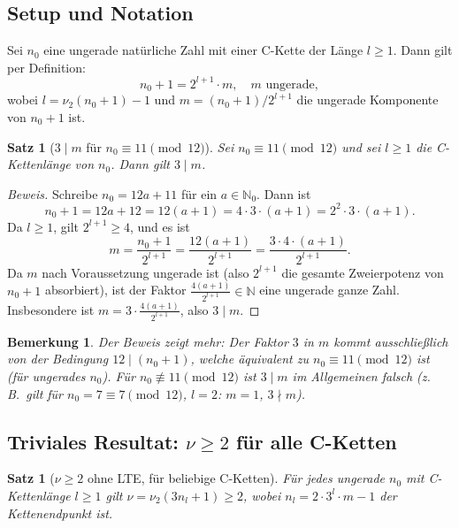\documentclass[12pt,a4paper]{article}
\newtheorem{bemerkung}[definition]{Bemerkung}
\newtheorem{satz}[definition]{Satz}
\newenvironment{beweis}{\begin{proof}[Beweis]}{\end{proof}}
\newcommand{\vii}{\nu_2}
\newcommand{\N}{\mathbb{N}}
\begin{document}
\subsection{Setup und Notation}

Sei $n_0$ eine ungerade natürliche Zahl mit einer C-Kette der Länge $l \geq 1$.
Dann gilt per Definition:
\[
  n_0 + 1 = 2^{l+1} \cdot m, \quad m \text{ ungerade},
\]
wobei $l = \vii(n_0 + 1) - 1$ und $m = (n_0 + 1)/2^{l+1}$ die ungerade
Komponente von $n_0 + 1$ ist.

\begin{satz}[$3 \mid m$ für $n_0 \equiv 11 \pmod{12}$]
\label{satz:drei_teilt_m}
Sei $n_0 \equiv 11 \pmod{12}$ und sei $l \geq 1$ die C-Kettenlänge von $n_0$.
Dann gilt $3 \mid m$.
\end{satz}

\begin{beweis}
Schreibe $n_0 = 12a + 11$ für ein $a \in \N_0$.
Dann ist
\[
  n_0 + 1 = 12a + 12 = 12(a+1) = 4 \cdot 3 \cdot (a+1) = 2^2 \cdot 3 \cdot (a+1).
\]
Da $l \geq 1$, gilt $2^{l+1} \geq 4$, und es ist
\[
  m = \frac{n_0 + 1}{2^{l+1}} = \frac{12(a+1)}{2^{l+1}} = \frac{3 \cdot 4 \cdot (a+1)}{2^{l+1}}.
\]
Da $m$ nach Voraussetzung ungerade ist (also $2^{l+1}$ die gesamte Zweierpotenz
von $n_0 + 1$ absorbiert), ist der Faktor $\frac{4(a+1)}{2^{l+1}} \in \N$ eine
ungerade ganze Zahl.
Insbesondere ist $m = 3 \cdot \frac{4(a+1)}{2^{l+1}}$, also $3 \mid m$.
\end{beweis}

\begin{bemerkung}
Der Beweis zeigt mehr: Der Faktor $3$ in $m$ kommt ausschließlich von der
Bedingung $12 \mid (n_0 + 1)$, welche äquivalent zu $n_0 \equiv 11 \pmod{12}$
ist (für ungerades $n_0$).
Für $n_0 \not\equiv 11 \pmod{12}$ ist $3 \mid m$ im Allgemeinen falsch
(z.\,B.\ gilt für $n_0 = 7 \equiv 7 \pmod{12}$, $l=2$: $m = 1$, $3 \nmid m$).
\end{bemerkung}

\subsection{Triviales Resultat: \texorpdfstring{$\nu \geq 2$}{nu >= 2} für alle C-Ketten}

\begin{satz}[$\nu \geq 2$ ohne LTE, für beliebige C-Ketten]
\label{satz:nu_geq_2}
Für jedes ungerade $n_0$ mit C-Kettenlänge $l \geq 1$ gilt
$\nu = \vii(3n_l + 1) \geq 2$,
wobei $n_l = 2 \cdot 3^l \cdot m - 1$ der Kettenendpunkt ist.
\end{satz}
\end{document}
